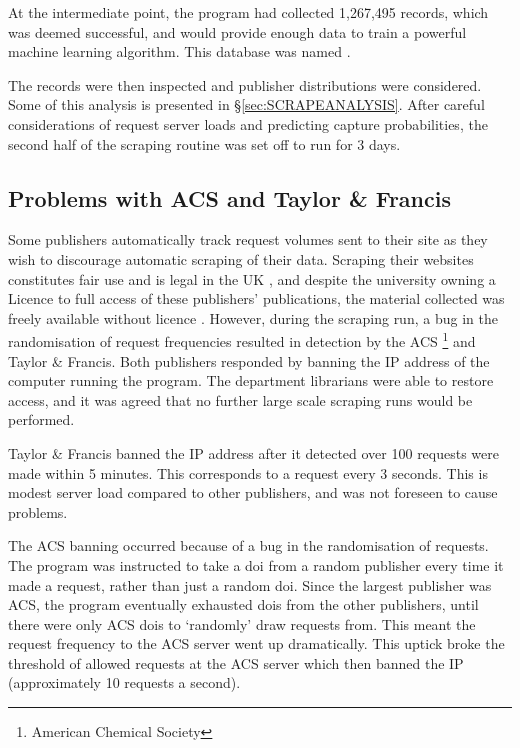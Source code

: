 At the intermediate point, the program had collected 1,267,495 records, which was deemed successful, and would provide enough data to train a powerful machine learning algorithm. This database was named .

The records were then inspected and publisher distributions were considered. Some of this analysis is presented in \S\ref{sec:SCRAPEANALYSIS}. After careful considerations of request server loads and predicting capture probabilities, the second half of the scraping routine was set off to run for 3 days.
\label{sec:CROSSREFSCRAPE}
\subsection{Problems with ACS and Taylor \& Francis}
Some publishers automatically track request volumes sent to their site as they wish to discourage automatic scraping of their data. Scraping their websites constitutes fair use and is legal in the UK , and despite the university owning a Licence to full access of these publishers' publications, the material collected was freely available without licence\cite{thelaw} \cite{contentminelegal}. However, during the scraping run, a bug in the randomisation of request frequencies resulted in detection by the ACS \footnote{American Chemical Society} and Taylor \& Francis. Both publishers responded by banning the IP address of the computer running the program. The department librarians were able to restore access, and it was agreed that no further large scale scraping runs would be performed. 

Taylor \& Francis banned the IP address after it detected over 100 requests were made within 5 minutes. This corresponds to a request every 3 seconds. This is modest server load compared to other publishers, and was not foreseen to cause problems.

The ACS banning occurred because of a bug in the randomisation of requests. The program was instructed to take a doi from a random publisher every time it made a request, rather than just a random doi. Since the largest publisher was ACS, the program eventually exhausted dois from the other publishers, until there were only ACS dois to `randomly' draw requests from. This meant the request frequency to the ACS server went up dramatically. This uptick broke the threshold of allowed requests at the ACS server which then banned the IP (approximately 10 requests a second).

